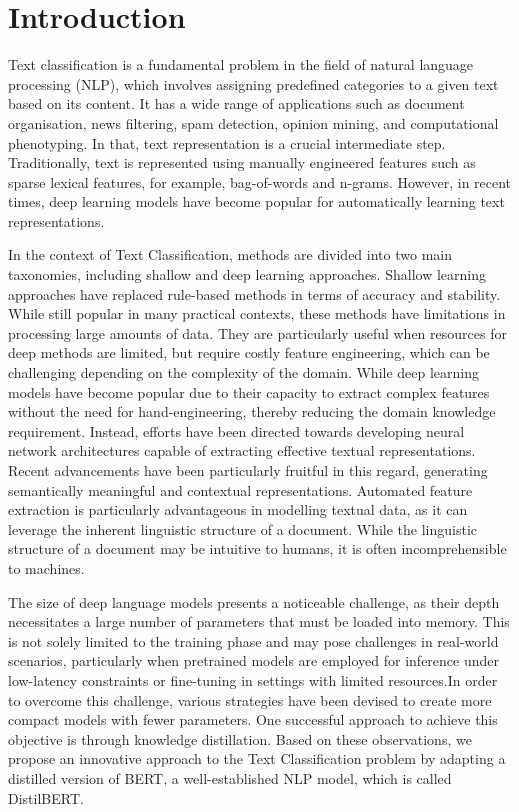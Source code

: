 \section{Introduction}
Text classification is a fundamental problem in the field of natural language processing (NLP), which involves assigning predefined categories to a given text based on its content. It has a wide range of applications such as document organisation, news filtering, spam detection, opinion mining, and computational phenotyping.  In that, text representation is a crucial intermediate step. Traditionally, text is represented using manually engineered features such as sparse lexical features, for example, bag-of-words and n-grams. However, in recent times, deep learning models have become popular for automatically learning text representations. 

In the context of Text Classification, methods are divided into two main taxonomies, including shallow and deep learning approaches. Shallow learning approaches have replaced rule-based methods in terms of accuracy and stability. While still popular in many practical contexts, these methods have limitations in processing large amounts of data. They are particularly useful when resources for deep methods are limited, but require costly feature engineering, which can be challenging depending on the complexity of the domain. While deep learning models have become popular due to their capacity to extract complex features without the need for hand-engineering, thereby reducing the domain knowledge requirement. Instead, efforts have been directed towards developing neural network architectures capable of extracting effective textual representations. Recent advancements have been particularly fruitful in this regard, generating semantically meaningful and contextual representations. Automated feature extraction is particularly advantageous in modelling textual data, as it can leverage the inherent linguistic structure of a document. While the linguistic structure of a document may be intuitive to humans, it is often incomprehensible to machines.

The size of deep language models presents a noticeable challenge, as their depth necessitates a large number of parameters that must be loaded into memory. This is not solely limited to the training phase and may pose challenges in real-world scenarios, particularly when pretrained models are employed for inference under low-latency constraints or fine-tuning in settings with limited resources.In order to overcome this challenge, various strategies have been devised to create more compact models with fewer parameters. One successful approach to achieve this objective is through knowledge distillation. Based on these observations, we propose an innovative approach to the Text Classification problem by adapting a distilled version of BERT\cite{DevlinCLT19}, a well-established NLP model, which is called DistilBERT\cite{Sanh2019}.